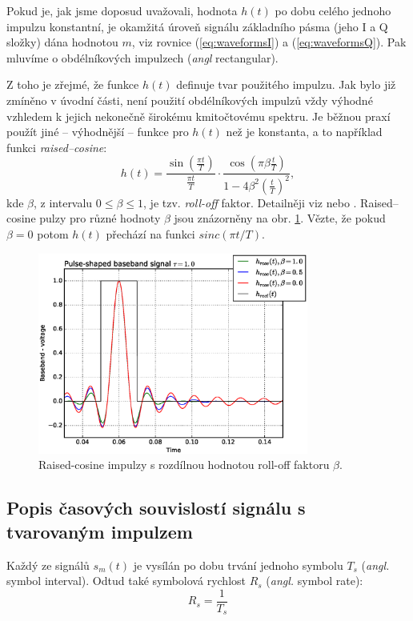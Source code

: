 Pokud je, jak jsme doposud uvažovali, hodnota $h(t)$ po dobu celého jednoho impulzu konstantní, je okamžitá úroveň signálu základního pásma (jeho I a Q složky) dána hodnotou $m$, viz rovnice (\ref{eq:waveformsI}) a (\ref{eq:waveformsQ}). Pak mluvíme o obdélníkových impulzech (\textsl{angl} rectangular).

Z toho je zřejmé, že funkce $h(t)$ definuje tvar použitého impulzu. Jak bylo již zmíněno v úvodní části, není použití obdélníkových impulzů vždy výhodné vzhledem k jejich nekonečně širokému kmitočtovému spektru. Je běžnou praxí použít jiné -- výhodnější -- funkce pro $h(t)$ než je konstanta, a to například funkci \textsl{raised--cosine}:
 \begin{equation}
 h(t) =  \frac{\sin(\frac{\pi t}{T})}{\frac{\pi t}{T}}\cdot \frac{\cos(\pi \beta \frac{t}{T})}{1-4 \beta^2 (\frac{t}{T})^2}, \label{eq:pulseRC}
\end{equation}
kde $\beta$, z intervalu $0\leq \beta \leq 1$, je tzv. \textsl{roll-off} faktor. Detailněji viz \cite{lathi2009} nebo \cite{proakis2007}. Raised--cosine pulzy pro různé hodnoty $\beta$ jsou znázorněny na obr. \ref{fig:pulse_RCbeta}. Vězte, že pokud $\beta = 0$ potom $h(t)$ přechází na funkci $sinc(\pi t / T)$.

\begin{figure}[!t]
  \centering
  \includegraphics[width=3.5in]{./ch_03/img/Pulse_shaping_1.eps}
  \hfil
  \caption{Raised-cosine impulzy s rozdílnou hodnotou roll-off faktoru $\beta$.\label{fig:pulse_RCbeta}}
\end{figure}

\subsection{Popis časových souvislostí signálu s tvarovaným impulzem}
Každý ze signálů $s_m(t)$ je vysílán po dobu trvání jednoho symbolu $T_s$ (\textsl{angl.} symbol interval). Odtud také symbolová rychlost $R_s$ (\textsl{angl.} symbol rate): 
\begin{equation}
 R_s = \frac{1}{T_s}  \label{eq:symrate}
\end{equation}

